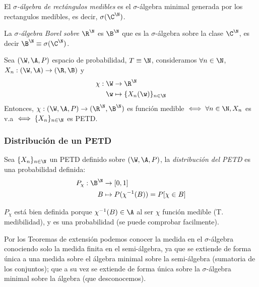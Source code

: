 
\begin{ndef}
  El \emph{$\sigma$-álgebra de rectángulos medibles} es el $\sigma$-álgebra minimal generada por los rectangulos medibles, es decir, $\sigma(\C^\N)$.
\end{ndef}

\begin{ndef}
  La \emph{$\sigma$-álgebra Borel sobre $\R^\N$} es $\B^\N$ que es la $\sigma$-álgebra sobre la clase $\C^\N$, es decir $\B^\N \equiv \sigma(\C^\N)$.
\end{ndef}

\begin{nth}
  Sea $(\W, \A, P)$ espacio de probabilidad, $T \equiv \N$, consideramos $\forall n \in \N$, $X_n : (\W, \A) \to (\R, \B)$ y
  \begin{align*}
    \chi : \W & \to \R^\N \\
    \w & \mapsto \{X_n(\w)\}_{n \in \N}
  \end{align*}
  Entonces, $\chi : (\W, \A, P) \to (\R^\N, \B^\N)$ es función medible $\iff \forall n \in \N, X_n$ es v.a $\iff \{X_n\}_{n \in \N}$ es PETD.
\end{nth}

\subsubsection{Distribución de un PETD}

\begin{ndef}
  Sea $\{X_n\}_{n \in \N}$ un PETD definido sobre $(\W, \A, P)$, la \emph{distribución del PETD} es una probabilidad definida:
  \begin{align*}
    P_\chi : \B^\N & \to [0, 1] \\
    B & \mapsto P(\chi^{-1}(B)) = P[\chi \in B]
  \end{align*}
\end{ndef}

$P_\chi$ está bien definida porque $\chi^{-1}(B) \in \A$ al ser $\chi$ función medible (T. medibilidad), y es una probabilidad (se puede comprobar facilmente).

Por los Teoremas de extensión podemos conocer la medida en el $\sigma$-álgebra conociendo solo la medida finita en el semi-álgebra, ya que se extiende de forma única a una medida sobre el álgebra minimal sobre la semi-álgebra (sumatoria de los conjuntos); que a su vez se extiende de forma única sobre la $\sigma$-álgebra minimal sobre la álgebra (que desconocemos).

